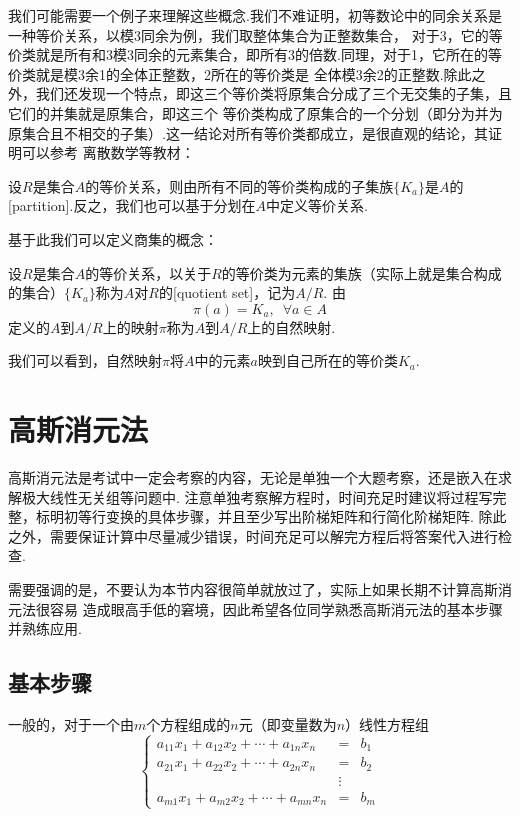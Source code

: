我们可能需要一个例子来理解这些概念.我们不难证明，初等数论中的同余关系是一种等价关系，以模3同余为例，我们取整体集合为正整数集合，
对于3，它的等价类就是所有和3模3同余的元素集合，即所有3的倍数.同理，对于1，它所在的等价类就是模3余1的全体正整数，2所在的等价类是
全体模3余2的正整数.除此之外，我们还发现一个特点，即这三个等价类将原集合分成了三个无交集的子集，且它们的并集就是原集合，即这三个
等价类构成了原集合的一个分划（即分为并为原集合且不相交的子集）.这一结论对所有等价类都成立，是很直观的结论，其证明可以参考
离散数学等教材：
\begin{theorem}
    设$R$是集合$A$的等价关系，则由所有不同的等价类构成的子集族$\{K_a\}$是$A$的[partition].反之，我们也可以基于分划在$A$中定义等价关系.
\end{theorem}
基于此我们可以定义商集的概念：
\begin{definition}
    设$R$是集合$A$的等价关系，以关于$R$的等价类为元素的集族（实际上就是集合构成的集合）$\{K_a\}$称为$A$对$R$的[quotient set]，记为$A/R$.
    由
    \[\pi(a) = K_a, \enspace \forall a\in A\]
    定义的$A$到$A/R$上的映射$\pi$称为$A$到$A/R$上的自然映射.
\end{definition}
我们可以看到，自然映射$\pi$将$A$中的元素$a$映到自己所在的等价类$K_a$.

\section{高斯消元法}
高斯消元法是考试中一定会考察的内容，无论是单独一个大题考察，还是嵌入在求解极大线性无关组等问题中.
注意单独考察解方程时，时间充足时建议将过程写完整，标明初等行变换的具体步骤，并且至少写出阶梯矩阵和行简化阶梯矩阵.
除此之外，需要保证计算中尽量减少错误，时间充足可以解完方程后将答案代入进行检查.

需要强调的是，不要认为本节内容很简单就放过了，实际上如果长期不计算高斯消元法很容易
造成眼高手低的窘境，因此希望各位同学熟悉高斯消元法的基本步骤并熟练应用.
\subsection{基本步骤}
一般的，对于一个由$m$个方程组成的$n$元（即变量数为$n$）线性方程组
\[ \left\{
\begin{array}{rcl}
    a_{11}x_1+a_{12}x_2+\cdots+a_{1n}x_n&=&b_1 \\
    a_{21}x_1+a_{22}x_2+\cdots+a_{2n}x_n&=&b_2 \\
    &\vdots& \\
    a_{m1}x_1+a_{m2}x_2+\cdots+a_{mn}x_n&=&b_m
\end{array}
\right. \]

